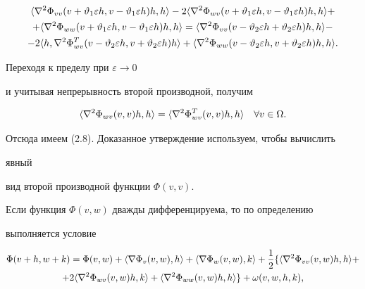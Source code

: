 \begin{multline*}


\la\nabla^2\Phi_{vv}(v+\vartheta_1\varepsilon h,v-\vartheta_1


\varepsilon h)h,h\ra-2\la\nabla^2\Phi_{wv}


(v+\vartheta_1\varepsilon h,v-\vartheta_1\varepsilon h)h,h\ra+\\


+\la\nabla^2\Phi_{ww}(v+\vartheta_1\varepsilon h,


v-\vartheta_1\varepsilon h)h,h\ra=\la\nabla^2\Phi_{vv}


(v-\vartheta_2\varepsilon h+\vartheta_2\varepsilon h)h,h\ra-\\


-2\la h,\nabla^2\Phi^T_{wv}(v-\vartheta_2\varepsilon h,


v+\vartheta_2\varepsilon h)h\ra+\la\nabla^2\Phi_{ww}


(v-\vartheta_2\varepsilon h,v+\vartheta_2\varepsilon h)h,h\ra.


\end{multline*}





Переходя к пределу при $\varepsilon\to 0$


и учитывая непрерывность второй производной, получим


$$


\la\nabla^2\Phi_{wv}(v,v)h,h\ra=\la\nabla^2\Phi^T_{wv}


(v,v)h,h\ra\quad \forall v\in \Omega.


$$


Отсюда имеем (2.8). Доказанное утверждение используем, чтобы вычислить


явный


вид второй производной функции $\Phi(v,v)$.





Если функция $\Phi(v,w)$ дважды дифференцируема, то по определению


выполняется условие


\begin{multline}


\Phi(v+h,w+k)=\Phi(v,w)+\la\nabla\Phi_v(v,w),h\ra+


\la\nabla\Phi_w(v,w),k\ra+\frac{1}{2}\{\la\nabla^2\Phi_{vv}(v,w)


h,h\ra+\\


+2\la\nabla^2\Phi_{wv}(v,w)h,k\ra+\la\nabla^2\Phi_{ww}


(v,w)h,h\ra\}+\omega(v,w,h,k),


\end{multline}


